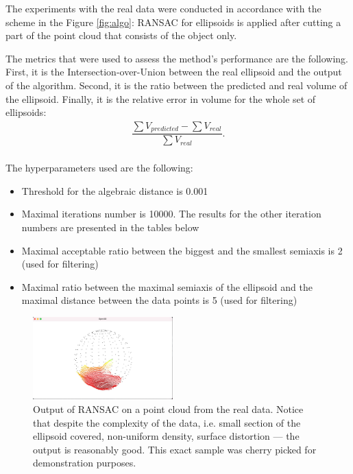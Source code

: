
The experiments with the real data were conducted in accordance with the scheme in the Figure \ref{fig:algo}: RANSAC for ellipsoids is applied after cutting a part of the point cloud that consists of the object only.

The metrics that were used to assess the method's performance are the following.
First, it is the Intersection-over-Union between the real ellipsoid and the output of the algorithm.
Second, it is the ratio between the predicted and real volume of the ellipsoid.
Finally, it is the relative error in volume for the whole set of ellipsoids:
\begin{align*}
  \dfrac{\sum V_{predicted} - \sum V_{real}}{\sum V_{real}}. \\
  \tag{22}
  \end{align*}

The hyperparameters used are the following:
\begin{itemize}
    \item Threshold for the algebraic distance is 0.001
    \item Maximal iterations number is 10000. The results for the other iteration numbers are presented in the tables below
    \item Maximal acceptable ratio between the biggest and the smallest semiaxis is 2 (used for filtering)
    \item Maximal ratio between the maximal semiaxis of the ellipsoid and the maximal distance between the data points is 5 (used for filtering)
\end{itemize}

\begin{figure}[!htb]
  \centering
  \includegraphics[width=0.48\textwidth]{images/ransac_synt2}
  \caption{Output of RANSAC on a point cloud from the real data. Notice that despite the complexity of the data, i.e. small section of the ellipsoid covered, non-uniform density, surface distortion — the output is reasonably good. This exact sample was cherry picked for demonstration purposes.}
\label{fig:real_data_output}
\end{figure}

